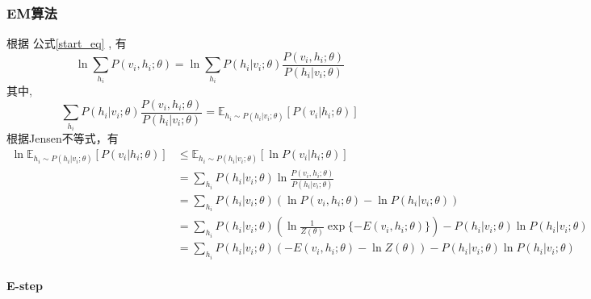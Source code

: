 \documentclass[UTF8]{ctexart}
\numberwithin{equation}{section}
\begin{document}
\subsubsection*{EM算法}
根据 公式\ref{start_eq} , 有
\begin{equation*}
    \ln \sum_{h_i} P(v_i, h_i; \theta)
    = \ln \sum_{h_i} P(h_i | v_i; \theta) \frac{P(v_i, h_i; \theta)}{P(h_i | v_i; \theta)}
\end{equation*}
其中,
\begin{equation*}
    \sum_{h_i} P(h_i | v_i; \theta) \frac{P(v_i, h_i; \theta)}{P(h_i | v_i; \theta)} = \mathbb{E}_{h_i\sim P(h_i|v_i;\theta)}[P(v_i|h_i;\theta)]
\end{equation*}
根据Jensen不等式，有
\begin{equation}
    \begin{aligned}
        \ln \mathbb{E}_{h_i\sim P(h_i|v_i;\theta)}[P(v_i|h_i;\theta)] 
        &\leq \mathbb{E}_{h_i\sim P(h_i|v_i;\theta)}[\ln P(v_i|h_i;\theta)]  \\
        &= \sum_{h_i}  P(h_i | v_i; \theta) \ln \frac{P(v_i, h_i; \theta)}{P(h_i | v_i; \theta)} \\
        &= \sum_{h_i} P(h_i | v_i; \theta) (\ln P(v_i,h_i;\theta) - \ln P(h_i | v_i; \theta)) \\
        &= \sum_{h_i} P(h_i | v_i; \theta)(\ln \frac{1}{Z(\theta)} \exp \{-E(v_i,h_i;\theta)\}) - P(h_i | v_i; \theta)\ln P(h_i | v_i; \theta) \\
        &= \sum_{h_i} P(h_i | v_i; \theta)(-E(v_i,h_i;\theta) -\ln Z(\theta)) - P(h_i | v_i; \theta)\ln P(h_i | v_i; \theta) \\
    \end{aligned} 
    \label{jensen_eq}
\end{equation}

\textbf{E-step}
\end{document}
